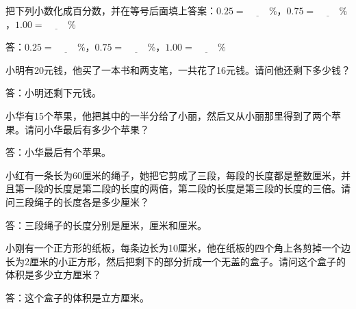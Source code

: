 \documentclass{ksexam}
\begin{document}
\begin{questions}
    \question[8] 把下列小数化成百分数，并在等号后面填上答案：$0.25 = \underline{\hspace{1cm}} \%$，$0.75 = \underline{\hspace{1cm}} \%$，$1.00 = \underline{\hspace{1cm}} \%$

    答：$0.25 = \underline{\hspace{1cm}} \%$，$0.75 = \underline{\hspace{1cm}} \%$，$1.00 = \underline{\hspace{1cm}} \%$

    \question[14] 小明有20元钱，他买了一本书和两支笔，一共花了16元钱。请问他还剩下多少钱？

    答：小明还剩下\underline{\hspace{2cm}}元钱。

    \question[14] 小华有15个苹果，他把其中的一半分给了小丽，然后又从小丽那里得到了两个苹果。请问小华最后有多少个苹果？

    答：小华最后有\underline{\hspace{2cm}}个苹果。

    \question[14] 小红有一条长为60厘米的绳子，她把它剪成了三段，每段的长度都是整数厘米，并且第一段的长度是第二段的长度的两倍，第二段的长度是第三段的长度的三倍。请问三段绳子的长度各是多少厘米？

    答：三段绳子的长度分别是\underline{\hspace{2cm}}厘米，\underline{\hspace{2cm}}厘米和\underline{\hspace{2cm}}厘米。

    \question[14] 小刚有一个正方形的纸板，每条边长为10厘米，他在纸板的四个角上各剪掉一个边长为2厘米的小正方形，然后把剩下的部分折成一个无盖的盒子。请问这个盒子的体积是多少立方厘米？

    答：这个盒子的体积是\underline{\hspace{2cm}}立方厘米。

\end{questions}
\end{document}
